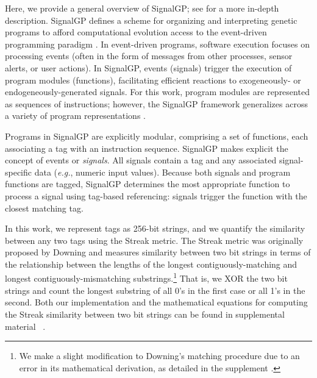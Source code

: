 Here, we provide a general overview of SignalGP; see \citep{lalejini_evolving_2018} for a more in-depth description.
SignalGP defines a scheme for organizing and interpreting genetic programs to afford computational evolution access to the event-driven programming paradigm \citep{cassandras_event-driven_2014}.
In event-driven programs, software execution focuses on processing events (often in the form of messages from other processes, sensor alerts, or user actions).
In SignalGP, events (signals) trigger the execution of program modules (functions), facilitating efficient reactions to exogeneously- or endogeneously-generated signals.
For this work, program modules are represented as sequences of instructions; however, the SignalGP framework generalizes across a variety of program representations \citep{lalejini_what_2019}.

Programs in SignalGP are explicitly modular, comprising a set of functions, each associating a tag with an instruction sequence.
SignalGP makes explicit the concept of events or \textit{signals}.
All signals contain a tag and any associated signal-specific data (\textit{e.g.}, numeric input values).
Because both signals and program functions are tagged, SignalGP determines the most appropriate function to process a signal using tag-based referencing: signals trigger the function with the closest matching tag.


In this work, we represent tags as 256-bit strings, and we quantify the similarity between any two tags using the Streak metric.
The Streak metric was originally proposed by Downing \citep{downing_intelligence_2015} and measures similarity between two bit strings in terms of the relationship between the lengths of the longest contiguously-matching and longest contiguously-mismatching substrings.\footnote{
We make a slight modification to Downing's matching procedure due to an error in its mathematical derivation, as detailed in the supplement \citep{tag_regulation_supplement_2021}.
}
That is, we XOR the two bit strings and count the longest substring of all 0's in the first case or all 1's in the second.
Both our implementation and the mathematical equations for computing the Streak similarity between two bit strings can be found in supplemental material \supSecStreakMetric\ \citep{tag_regulation_supplement_2021}.

